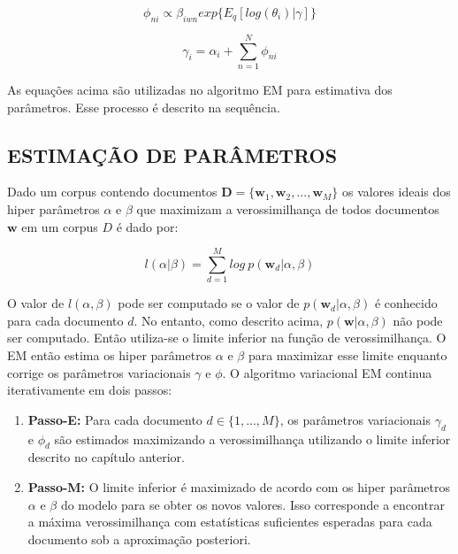 \documentclass[12pt,a4paper]{article}
\begin{document}
\begin{equation}
\phi_{ni} \propto \beta_{iwn} exp\{E_q[log(\theta_i)|\gamma]\}
\end{equation}

\begin{equation}
\gamma_i = \alpha_i + \sum_{n=1}^{N} \phi_{ni}
\end{equation}

As equações acima são utilizadas no algoritmo EM para estimativa dos parâmetros. Esse processo é descrito na sequência.

\subsection{ESTIMAÇÃO DE PARÂMETROS} \label{sec:estimacao-parametros}
Dado um corpus contendo documentos $\textbf{D} = \{\textbf{w}_1, \textbf{w}_2, . . ., \textbf{w}_M\}$ os valores ideais dos hiper parâmetros $\alpha$ e $\beta$
 que maximizam a verossimilhança de todos documentos $\textbf{w}$ em um corpus $D$ é dado por:

\begin{equation}
l(\alpha|\beta) = \sum_{d=1}^{M} log\ p(\textbf{w}_d|\alpha,\beta)
\end{equation}

O valor de $l(\alpha, \beta)$ pode ser computado se o valor de $p(\textbf{w}_d|\alpha, \beta)$ é conhecido para cada documento $d$. No entanto,
 como descrito acima, $p(\textbf{w}|\alpha,\beta)$ não pode ser computado. Então utiliza-se o limite inferior na função de verossimilhança.
 O EM então estima os hiper parâmetros $\alpha$ e $\beta$ para maximizar esse limite enquanto corrige os parâmetros variacionais $\gamma$ e $\phi$. 
 O algoritmo variacional EM continua iterativamente em dois passos:

\begin{enumerate}
\item \textbf{Passo-E:} Para cada documento $d \in \{1,. . . , M\}$, os parâmetros variacionais $\gamma_d$ e $\phi_d$ são estimados maximizando a verossimilhança utilizando o limite inferior descrito no capítulo anterior.
\item \textbf{Passo-M:} O limite inferior é maximizado  de acordo com os hiper parâmetros $\alpha$ e $\beta$ do modelo para se obter os novos valores. 
 Isso corresponde a encontrar a máxima verossimilhança com estatísticas suficientes esperadas para cada documento sob a aproximação posteriori.
\end{enumerate}
\end{document}

